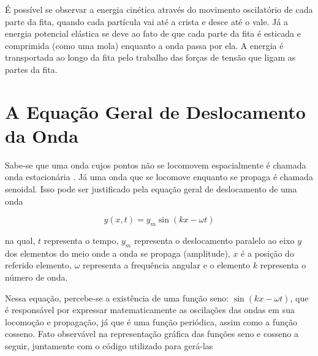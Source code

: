 		É possível se observar a energia cinética através do movimento oscilatório de cada parte da fita, quando cada partícula vai até a crista e desce até o vale. Já a energia potencial elástica se deve ao fato de que cada parte da fita é esticada e comprimida (como uma mola) enquanto a onda passa por ela. A energia é transportada ao longo da fita pelo trabalho das forças de tensão que ligam as partes da fita.
	
	\section{A Equação Geral de Deslocamento da Onda}
	
		Sabe-se que uma onda cujos pontos não se locomovem espacialmente é chamada onda estacionária \cite{wiki:stateWave}. Já uma onda que se locomove enquanto se propaga é chamada senoidal. Isso pode ser justificado pela equação geral de deslocamento de uma onda
		
		\[y(x,t)=y_{m}\sin(kx-\omega t)\]
		
		na qual, $t$ representa o tempo, $y_{m}$ representa o deslocamento paralelo ao eixo $y$ dos elementos do meio onde a onda se propaga (amplitude), $x$ é a posição do referido elemento, $\omega$ representa a frequência angular e o elemento $k$ representa o número de onda.
		
		Nessa equação, percebe-se a existência de uma função seno: $\sin(kx-\omega t)$, que é responsável por expressar matematicamente as oscilações das ondas em sua locomoção e propagação, já que é uma função periódica, assim como a função cosseno. Fato observável na representação gráfica das funções seno e cosseno a seguir, juntamente com o código utilizado para gerá-las
		
